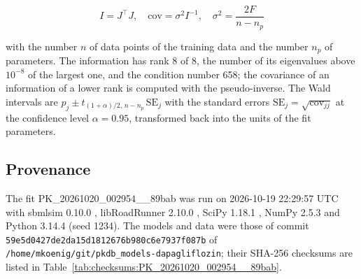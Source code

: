 \begin{equation}
I = J^\top J, \quad \mathrm{cov} = \sigma^2 I^{-1}, \quad \sigma^2 = \frac{2 F}{n - n_p}
\end{equation}

with the number $n$ of data points of the training data and the number $n_p$ of parameters. The information has rank 8 of 8, the number of its eigenvalues above $10^{-8}$ of the largest one, and the condition number 658; the covariance of an information of a lower rank is computed with the pseudo-inverse. The Wald intervals are $\hat{p}_j \pm t_{(1+\alpha)/2,\, n-n_p}\, \mathrm{SE}_j$ with the standard errors $\mathrm{SE}_j = \sqrt{\mathrm{cov}_{jj}}$ at the confidence level $\alpha = 0.95$, transformed back into the units of the fit parameters.

\subsection{Provenance}

The fit PK\_20261020\_002954\_\_89bab was run on 2026-10-19 22:29:57 UTC with sbmlsim 0.10.0 \cite{Koenig2026_sbmlsim}, libRoadRunner 2.10.0 \cite{Welsh2023}, SciPy 1.18.1 \cite{Virtanen2020}, NumPy 2.5.3 \cite{Harris2020} and Python 3.14.4 (seed 1234). The models and data were those of commit \texttt{59e5d0427de2da15d1812676b980c6e7937f087b} of \texttt{/home/mkoenig/git/pkdb\_models-dapagliflozin}; their SHA-256 checksums are listed in Table~\ref{tab:checksums:PK_20261020_002954__89bab}.

